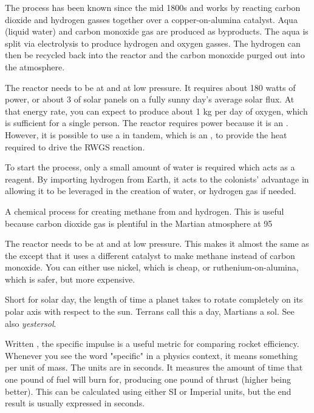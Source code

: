 {{%
\startformula
{}
\stopformula

The process has been known since the mid 1800s and works by reacting carbon dioxide and hydrogen gasses together over a copper-on-alumina catalyst. Aqua (liquid water) and carbon monoxide gas are produced as byproducts. The aqua is split via electrolysis to produce hydrogen and oxygen gasses. The hydrogen can then be recycled back into the reactor and the carbon monoxide purged out into the atmosphere.

The reactor needs to be at  and at low pressure. It requires about 180 watts of power, or about 3 \Square \Meter of solar panels on a fully sunny day's average solar flux. At that energy rate, you can expect to produce about 1 kg per day of oxygen, which is sufficient for a single person. The reactor requires power because it is an . However, it is possible to use a  in tandem, which is an , to provide the heat required to drive the RWGS reaction.

To start the process, only a small amount of water is required which acts as a reagent. By importing hydrogen from Earth, it acts to the colonists' advantage in allowing it to be leveraged in the creation of water, or hydrogen gas if needed.

A chemical process for creating methane  from  and hydrogen. This is useful because carbon dioxide gas is plentiful in the Martian atmosphere at 95 %

\startformula
{}
\stopformula

The reactor needs to be at  and at low pressure. This makes it almost the same as the  except that it uses a different catalyst to make methane instead of carbon monoxide. You can either use nickel, which is cheap, or ruthenium-on-alumina, which is safer, but more expensive.

Short for solar day, the length of time a planet takes to rotate completely on its polar axis with respect to the sun. Terrans call this a day, Martians a sol. See also {\it yestersol}.

Written , the specific impulse is a useful metric for comparing rocket efficiency. Whenever you see the word "specific" in a physics context, it means something per unit of mass. The units are in seconds. It measures the amount of time that one pound of fuel will burn for, producing one pound of thrust (higher being better). This can be calculated using either SI or Imperial units, but the end result is usually expressed in seconds. 

}}
